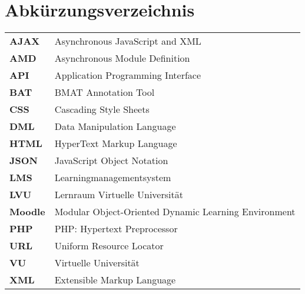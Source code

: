\documentclass[twoside,bibliography=totoc,openany,numbers=noenddot]{fumi}
\begin{document}
\renewcommand\lstlistlistingname{Verzeichnis der Auflistungen}
\lstlistoflistings
\cleardoublepage


\renewcommand*\listalgorithmcfname{Verzeichnis der Algorithmen}
\listofalgorithms
\cleardoublepage


\chapter*{Abkürzungsverzeichnis}


\renewcommand*{\arraystretch}{1.4}
\setlength{\LTleft}{0pt}
\begin{longtable}[l]{p{2cm}p{15cm}}
\textbf{AJAX} & Asynchronous JavaScript and XML \\
\textbf{AMD} & Asynchronous Module Definition \\
\textbf{API} & Application Programming Interface \\
\textbf{BAT} & BMAT Annotation Tool \\
\textbf{CSS} & Cascading Style Sheets \\
\textbf{DML} & Data Manipulation Language \\
\textbf{HTML} & HyperText Markup Language \\
\textbf{JSON} & JavaScript Object Notation \\
\textbf{LMS} & Learningmanagementsystem \\
\textbf{LVU} & Lernraum Virtuelle Universität \\
\textbf{Moodle} & Modular Object-Oriented Dynamic Learning Environment \\
\textbf{PHP} & PHP: Hypertext Preprocessor \\
\textbf{URL} & Uniform Resource Locator \\
\textbf{VU} & Virtuelle Universität \\
\textbf{XML} & Extensible Markup Language \\
\end{longtable}
\end{document}
